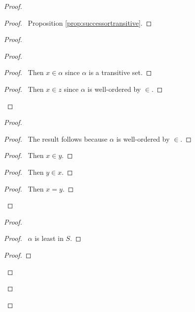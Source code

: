 \documentclass{book}
\let\qed\relax
\theoremstyle{definition}
\begin{document}
\begin{proof}
\pf
{}
\begin{proof}
	\pf\ Proposition \ref{prop:successortransitive}.
\end{proof}
\begin{proof}
	\begin{proof}
		\begin{proof}
			\pf\ Then $x \in \alpha$ since $\alpha$ is a transitive set.
		\end{proof}
		\begin{proof}
			\pf\ Then $x \in z$ since $\alpha$ is well-ordered by $\in$.
		\end{proof}
	\end{proof}
	\begin{proof}
		\begin{proof}
			\pf\ The result follows because $\alpha$ is well-ordered by $\in$.
		\end{proof}
		\begin{proof}
			\pf\ Then $x \in y$.
		\end{proof}
		\begin{proof}
			\pf\ Then $y \in x$.
		\end{proof}
		\begin{proof}
			\pf\ Then $x = y$.
		\end{proof}
	\end{proof}
	\begin{proof}
		\begin{proof}
			\pf\ $\alpha$ is least in $S$.
		\end{proof}
		\begin{proof}
		\end{proof}
	\end{proof}
\end{proof}
\qed
\end{proof}
\end{document}
